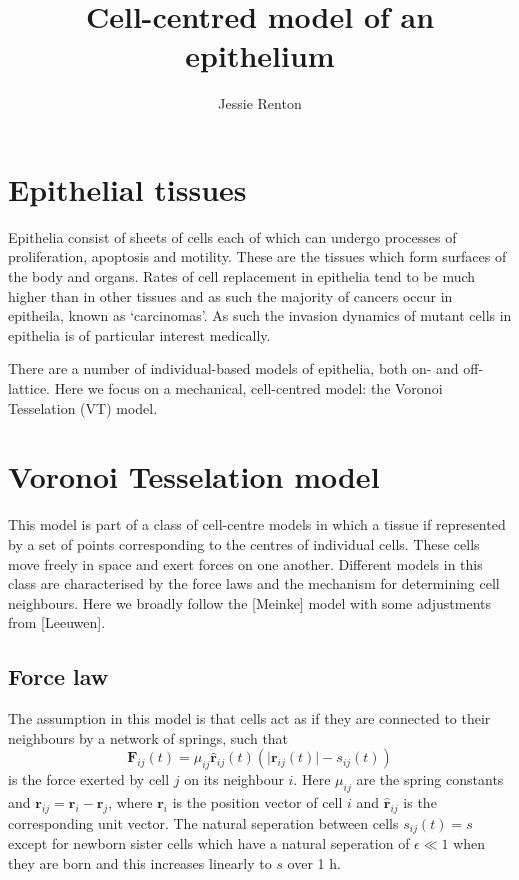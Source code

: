 \documentclass[a4paper]{article}
\title{Cell-centred model of an epithelium}
\author{Jessie Renton}
\begin{document}
 
\maketitle

\section{Epithelial tissues}
Epithelia consist of sheets of cells each of which can undergo processes of proliferation, apoptosis and motility. These are the tissues which form surfaces of the body and organs. Rates of cell replacement in epithelia tend to be much higher than in other tissues and as such the majority of cancers occur in epitheila, known as `carcinomas'. As such the invasion dynamics of mutant cells in epithelia is of particular interest medically.

There are a number of individual-based models of epithelia, both on- and off-lattice. Here we focus on a mechanical, cell-centred model: the Voronoi Tesselation (VT) model. 

\section{Voronoi Tesselation model}

This model is part of a class of cell-centre models in which a tissue if represented by a set of points corresponding to the centres of individual cells. These cells move freely in space and exert forces on one another. Different models in this class are characterised by the force laws and the mechanism for determining cell neighbours. Here we broadly follow the [Meinke] model with some adjustments from [Leeuwen].

\subsection{Force law}
The assumption in this model is that cells act as if they are connected to their neighbours by a network of springs, such that 
\begin{equation} \mathbf{F}_{ij}(t) = \mu_{ij}\hat{\mathbf{r}}_{ij}(t)(\vert \mathbf{r}_{ij}(t) \vert -s_{ij}(t))
	\end{equation}
is the force exerted by cell $j$ on its neighbour $i$. Here $\mu_{ij}$ are the spring constants and $\mathbf{r}_{ij}=\mathbf{r}_{i}-\mathbf{r}_ {j}$, where $\mathbf{r}_i$ is the position vector of cell $i$ and $\hat{\mathbf{r}}_{ij}$ is the corresponding unit vector. The natural seperation between cells $s_{ij}(t)=s$ except for newborn sister cells which have a natural seperation of $\epsilon \ll 1$ when they are born and this increases linearly to $s$ over 1 h.
\end{document}
